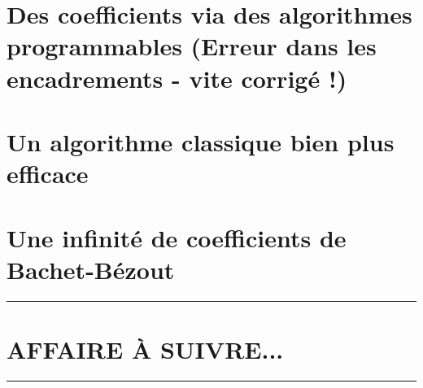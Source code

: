 \documentclass[12pt]{amsart}
\newcommand\bb{Bachet-Bézout}
\begin{document}
\newpage
\section{Des coefficients via des algorithmes programmables (Erreur dans les encadrements - vite corrigé !)}






\newpage
\section{Un algorithme classique bien plus efficace}






\newpage
\section{Une infinité de coefficients de \bb}







%



\bigskip

\hrule

\section{AFFAIRE À SUIVRE...}

\bigskip

\hrule
\end{document}
